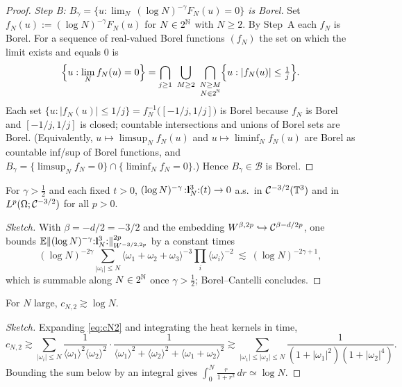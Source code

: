 \begin{proof}
\emph{Step B: $B_\gamma=\{u:\lim_{N}\,(\log N)^{-\gamma}F_N(u)=0\}$ is Borel.}
Set $f_N(u):=(\log N)^{-\gamma}F_N(u)$ for $N\in 2^{\mathbb{N}}$ with $N\ge2$. By Step~A
each $f_N$ is Borel. For a sequence of real-valued Borel functions $(f_N)$ the set
on which the limit exists and equals $0$ is
\[
\Bigl\{u:\lim_N f_N(u)=0\Bigr\}=\bigcap_{j\ge1}\ \bigcup_{M\ge2}\ \bigcap_{\substack{N\ge M\\ N\in2^{\qoneN}}}\Bigl\{u:|f_N(u)|\le\tfrac1j\Bigr\}.
\]
Each set $\{u:|f_N(u)|\le 1/j\}=f_N^{-1}\bigl([-1/j,1/j]\bigr)$ is Borel because
$f_N$ is Borel and $[-1/j,1/j]$ is closed; countable intersections and unions of
Borel sets are Borel. (Equivalently, $u\mapsto\limsup_N f_N(u)$ and
$u\mapsto\liminf_N f_N(u)$ are Borel as countable inf/sup of Borel functions, and
$B_\gamma=\{\limsup_N f_N=0\}\cap\{\liminf_N f_N=0\}$.) Hence $B_\gamma\in\mathcal B$
is Borel.
\end{proof}


\begin{qonelemma}\label{lem:cube}
For $\gamma>\tfrac12$ and each fixed $t>0$,
$(\log N)^{-\gamma}\,{:}\mathbf{l}_N^3{:}(t)\to0$ a.s.\ in $\mathcal{C}^{-3/2}(\mathbb{T}^3)$ and in
$L^p(\Omega;\mathcal{C}^{-3/2})$ for all $p>0$.
\end{qonelemma}

\begin{proof}[Sketch]
With $\beta=-d/2=-3/2$ and the embedding $W^{\beta,2p}\hookrightarrow
\mathcal{C}^{\beta-d/2p}$, one bounds
$\mathbb{E}\|(\log N)^{-\gamma}{:}\mathbf{l}_N^3{:}\|_{W^{-3/2,2p}}^{2p}$ by a constant times
\[
(\log N)^{-2\gamma}\sum_{|\omega_i|\le N}\langle\omega_1+\omega_2+\omega_3\rangle^{-3}\prod_{i}\langle\omega_i\rangle^{-2}
\ \lesssim\ (\log N)^{-2\gamma+1},
\]
which is summable along $N\in2^{\mathbb{N}}$ once $\gamma>\tfrac12$; Borel--Cantelli
concludes.
\end{proof}

\begin{qonelemma}\label{lem:logdiv}
For $N$ large, $c_{N,2}\gtrsim\log N$.
\end{qonelemma}

\begin{proof}[Sketch]
Expanding \eqref{eq:cN2} and integrating the heat kernels in time,
\[
c_{N,2}\gtrsim\sum_{|\omega_i|\le N}\frac{1}{\langle\omega_1\rangle^2\langle\omega_2\rangle^2}\cdot\frac{1}{\langle\omega_1\rangle^2+\langle\omega_2\rangle^2+\langle\omega_1+\omega_2\rangle^2}
\gtrsim\sum_{|\omega_1|\le|\omega_2|\le N}\frac{1}{(1+|\omega_1|^2)(1+|\omega_2|^4)}.
\]
Bounding the sum below by an integral gives
$\int_0^N\frac{r}{1+r^2}\,dr\simeq\log N$.
\end{proof}

